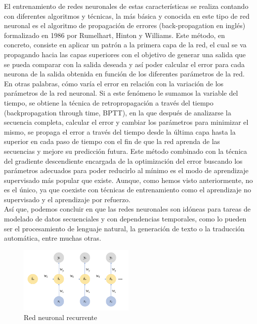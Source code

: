 El entrenamiento de redes neuronales de estas características se realiza contando con diferentes algoritmos y técnicas, la más básica y conocida en este tipo de red neuronal es el algoritmo de propagación de errores (back-propagation en inglés) formalizado en 1986 por Rumelhart, Hinton y Williams. Este método, en concreto, consiste en aplicar un patrón a la primera capa de la red, el cual se va propagando hacia las capas superiores con el objetivo de generar una salida que se pueda comparar con la salida deseada y así poder calcular el error para cada neurona de la salida obtenida en función de los diferentes parámetros de la red. En otras palabras, cómo varía el error en relación con la variación de los parámetros de la red neuronal. Si a este fenómeno le sumamos la variable del tiempo, se obtiene la técnica de retropropagación a través del tiempo (backpropagation through time, BPTT), en la que después de analizarse la secuencia completa, calcular el error y cambiar los parámetros para minimizar el mismo, se propaga el error a través del tiempo desde la última capa hasta la superior en cada paso de tiempo con el fin de que la red aprenda de las secuencias y mejore su predicción futura. 
Este método combinado con la técnica del gradiente descendiente encargada de la optimización del error buscando los parámetros adecuados para poder reducirlo al mínimo es el modo de aprendizaje supervisado más popular que existe.  Aunque, como hemos visto anteriormente, no es el único, ya que coexiste con técnicas de entrenamiento como el aprendizaje no supervisado y el aprendizaje por refuerzo. \\

Así que, podemos concluir en que las redes neuronales son idóneas para tareas de modelado de datos secuenciales y con dependencias temporales, como lo pueden ser el procesamiento de lenguaje natural, la generación de texto o la traducción automática, entre muchas otras.
\begin{figure}[h]
	\centering
	\includegraphics[width = 0.5\textwidth]{Imagenes/Vectorial/recurrente.png}
	\caption{Red neuronal recurrente}
	\label{fig:sampleImage}
\end{figure}


